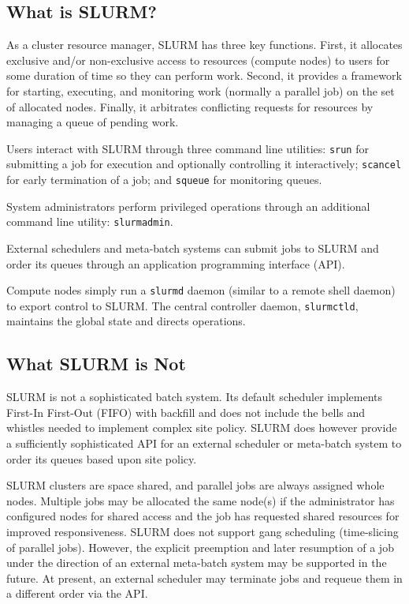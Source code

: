 \subsection{What is SLURM?}

As a cluster resource manager, SLURM has three key functions.  First,
it allocates exclusive and/or non-exclusive access to resources (compute nodes) to users for 
some duration of time so they can perform work.  Second, it provides 
a framework for starting, executing, and monitoring work (normally a 
parallel job) on the set of allocated nodes.  Finally, it arbitrates 
conflicting requests for resources by managing a queue of pending work.

Users interact with SLURM through three command line utilities: 
{\tt srun} for submitting a job for execution and optionally controlling it
interactively; 
{\tt scancel} for early termination of a job; 
and {\tt squeue} for monitoring queues.

System administrators perform privileged operations through an additional
command line utility: {\tt slurmadmin}.

External schedulers and meta-batch systems can submit jobs to SLURM and
order its queues through an application programming interface (API).

Compute nodes simply run a {\tt slurmd} daemon (similar to a remote shell 
daemon) to export control to SLURM.  The central controller daemon,
{\tt slurmctld}, maintains the global state and directs operations.

\subsection{What SLURM is Not}

SLURM is not a sophisticated batch system.  Its default scheduler
implements First-In First-Out (FIFO) with backfill and does not 
include the bells and whistles needed to implement complex site policy.
SLURM does however provide a sufficiently sophisticated API for an external 
scheduler or meta-batch system to order its queues based upon site policy.

SLURM clusters are space shared, and parallel jobs are always 
assigned whole nodes.  Multiple jobs may be allocated the same node(s) 
if the administrator has configured nodes for shared access and
the job has requested shared resources for improved responsiveness.
SLURM does not support gang scheduling (time-slicing 
of parallel jobs). However, the explicit preemption and later resumption 
of a job under the direction of an external meta-batch system may be supported 
in the future. At present, an external scheduler may terminate jobs and 
requeue them in a different order via the API. 

